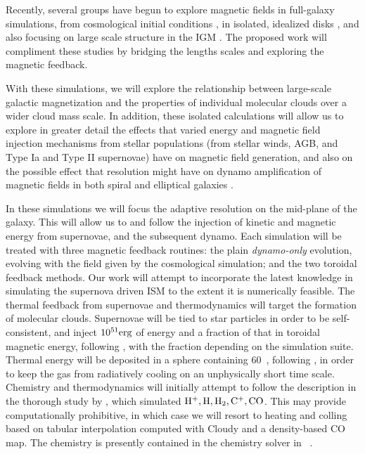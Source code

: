 Recently, several groups have begun to explore magnetic fields in full-galaxy
simulations,  from cosmological initial conditions
\citep{Pakmor17}, in isolated, idealized
disks \citep{Rieder16, Rieder17, Butsky17}, and also focusing on large scale structure in
the IGM \citep{Vazza17}.  The proposed work will compliment these studies by
bridging the lengths scales and exploring the magnetic feedback.

With these simulations, we will
explore the relationship between large-scale galactic magnetization
and the properties of individual molecular clouds over a wider cloud
mass scale.
In addition, these
isolated calculations will allow us to explore in greater detail the
effects that varied energy and magnetic field injection mechanisms from stellar
populations (from stellar winds, AGB, and Type Ia and Type II
supernovae) 
have on magnetic field generation, and also on the possible
effect that resolution might have on dynamo amplification of magnetic
fields in both spiral and elliptical galaxies \cite[an effect that was shown to
be important in high-redshift halos;
][]{2010ApJ...721L.134S,2013AN....334..531S}.

In these simulations we will focus the adaptive resolution on the mid-plane of
the galaxy. This will allow us to 
and follow the injection of kinetic and magnetic energy from supernovae, and the subsequent
dynamo.  
Each simulation will be treated with three
magnetic feedback routines: the
plain \emph{dynamo-only} evolution, evolving with the field given by the
cosmological simulation; and the two toroidal feedback methods.  
Our work will attempt to incorporate the latest knowledge in simulating the
supernova driven ISM \citep[e.g.][]{Hill12, Shetty12b, Kim15b, Walch15, Padoan16} to the extent it is numerically feasible.  
The thermal
feedback from supernovae
and thermodynamics will target the formation of molecular clouds.  Supernovae
will be tied to star particles in order to be self-consistent, and inject
$10^{51}\rm{erg}$ of energy and a fraction of that in toroidal magnetic energy,
following \citep{Butsky17}, with the fraction depending on the simulation suite.
Thermal energy will be deposited in a sphere containing 60~\msun, following
\citep{Joung06, Hill12}, in order to keep the gas from radiatively cooling on
an unphysically short time scale.
Chemistry and thermodynamics will initially attempt to 
follow the description in the thorough study by \citep{Walch15}, which
simulated $\rm{H}^+, \rm{H}, \rm{H_2}, \rm{C^+}, \rm{CO}$.  This may provide
computationally prohibitive, in which case we will resort to heating and colling
based on tabular interpolation computed with Cloudy \citep{2014ApJS..211...19B, Ferland17}
and a density-based CO map.  
The chemistry is presently contained in the chemistry solver in \enzo\
\cite[see, e.g.,][]{Tasker11,2014ApJ...783...75M}.

